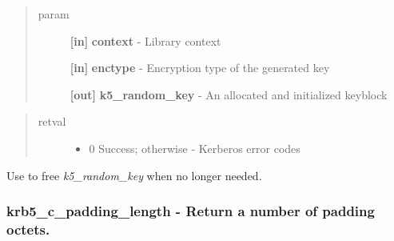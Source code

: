 \documentclass[letterpaper,10pt,english]{sphinxmanual}
\begin{document}
\begin{quote}\begin{description}
\item[{param}] \leavevmode
\textbf{{[}in{]}} \textbf{context} - Library context

\textbf{{[}in{]}} \textbf{enctype} - Encryption type of the generated key

\textbf{{[}out{]}} \textbf{k5\_random\_key} - An allocated and initialized keyblock

\end{description}\end{quote}
\begin{quote}\begin{description}
\item[{retval}] \leavevmode\begin{itemize}
\item {} 
0   Success; otherwise - Kerberos error codes

\end{itemize}

\end{description}\end{quote}

Use {\hyperref[appdev/refs/api/krb5_free_keyblock_contents:c.krb5_free_keyblock_contents]{}} to free \emph{k5\_random\_key} when no longer needed.


\subsubsection{krb5\_c\_padding\_length -  Return a number of padding octets.}
\label{appdev/refs/api/krb5_c_padding_length:krb5-c-padding-length-return-a-number-of-padding-octets}\label{appdev/refs/api/krb5_c_padding_length::doc}

\begin{fulllineitems}
\label{appdev/refs/api/krb5_c_padding_length:c.krb5_c_padding_length}
\end{fulllineitems}
\end{document}
